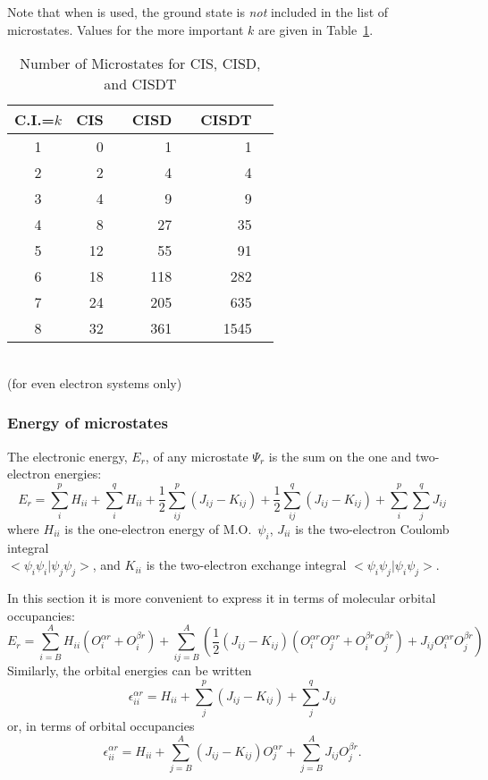 Note that when  is used, the ground state is {\em not} included in
the list of microstates. Values for the more important $k$ are given in
Table~\ref{micsdt}.
\begin{table}
\caption{\label{micsdt}Number of Microstates for CIS, CISD, and CISDT}
\begin{center}
\begin{tabular}{|crcrcrc|}
\hline
C.I.=$k$ & CIS &  & CISD &  & CISDT & \\ \hline
   1     &  0  &    &  1   &    &   1   &    \\
   2     &  2  &    &  4   &    &   4   &    \\
   3     &  4  &    &  9   &    &   9   &    \\
   4     &  8  &    &  27  &    &  35   &    \\
   5     & 12  &    &  55  &    &  91   &    \\
   6     & 18  &    &  118 &    & 282   &    \\
   7     & 24  &    &  205 &    & 635   &    \\
   8     & 32  &    &  361 &    & 1545  &    \\
\hline
\end{tabular}\\
(for even electron systems only)
\end{center}
\end{table}
\subsubsection{Energy of microstates}
The electronic energy, $E_r$, of any microstate $\Psi_r$ is the sum
on the one and two-electron energies:
$$
E_r = \sum_i^pH_{ii}+\sum_i^qH_{ii}+\frac{1}{2}\sum_{ij}^p(J_{ij}-K_{ij})
+\frac{1}{2}\sum_{ij}^q(J_{ij}-K_{ij}) +\sum_i^p\sum_j^qJ_{ij}
$$
where $H_{ii}$ is the one-electron energy of M.O.\ $\psi_i$,
$J_{ii}$ is the two-electron Coulomb integral\\
$<\psi_i\psi_i|\psi_j\psi_j>$,
and $K_{ii}$ is the two-electron exchange integral  $<\psi_i\psi_j|\psi_i\psi_j>$.

In this section it is more convenient to express it in terms
of molecular orbital occupancies:
$$
E_r = \sum_{i=B}^AH_{ii}(O_i^{\alpha r}+ O_i^{\beta r})
+\sum_{ij=B}^A(\frac{1}{2}(J_{ij}-K_{ij})
(O_i^{\alpha r}O_j^{\alpha r}+ O_i^{\beta r}O_j^{\beta r})
+J_{ij}O_i^{\alpha r}O_j^{\beta r})
$$
Similarly, the orbital energies can be written
$$
\epsilon_{ii}^{\alpha r} = H_{ii}+\sum_j^p(J_{ij}-K_{ij})+\sum_j^qJ_{ij}
$$
or, in terms of orbital occupancies
$$
\epsilon_{ii}^{\alpha r} = H_{ii}+\sum_{j=B}^A(J_{ij}-K_{ij})O_j^{\alpha r}
+\sum_{j=B}^AJ_{ij}O_j^{\beta r}.
$$

